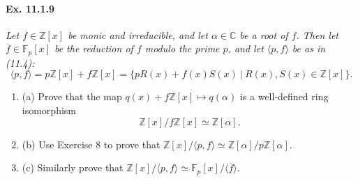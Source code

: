 \documentclass[11pt,a4paper]{article}
\newcommand{\be} {\begin{enumerate}}
\newcommand{\ee} {\end{enumerate}}
\newcommand{\Z}{\mathbb{Z}}
\newcommand{\C}{\mathbb{C}}
\newcommand{\F}{\mathbb{F}}
\begin{document}
\paragraph{Ex. 11.1.9}

{\it Let $f \in \Z[x]$ be monic and irreducible, and let $\alpha \in \C$ be a root of $f$. Then let $\overline{f} \in \F_p[x]$ be the reduction of $f$ modulo the prime $p$, and let $\langle p, f \rangle$ be as in (11.4):
$$\langle p,f\rangle = p\Z[x] + f\Z[x] =\{pR(x)+f(x)S(x)\ |\ R(x),S(x) \in \Z[x]\}.$$
\be
\item[(a)] Prove that the map $q(x) + f\Z[x] \mapsto q(\alpha)$ is a well-defined ring isomorphism $$\Z[x]/f\Z[x] \simeq \Z[\alpha].$$
\item[(b)] Use Exercise 8 to prove that $\Z[x]/\langle p, f\rangle \simeq \Z[\alpha]/p\Z[\alpha]$.
\item[(c)] Similarly prove that $\Z[x]/\langle p, f\rangle \simeq \F_p[x]/\langle \overline{f}\rangle$.
\ee
}
\end{document}
